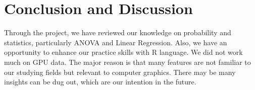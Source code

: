 \chapter{Conclusion and Discussion}
Through the project, we have reviewed our knowledge on probability and statistics, particularly ANOVA and Linear Regression. Also, we have an opportunity to enhance our practice skills with R language. We did not work much on GPU data. The major reason is that many features are not familiar to our studying fields but relevant to computer graphics. There may be many insights can be dug out, which are our intention in the future.